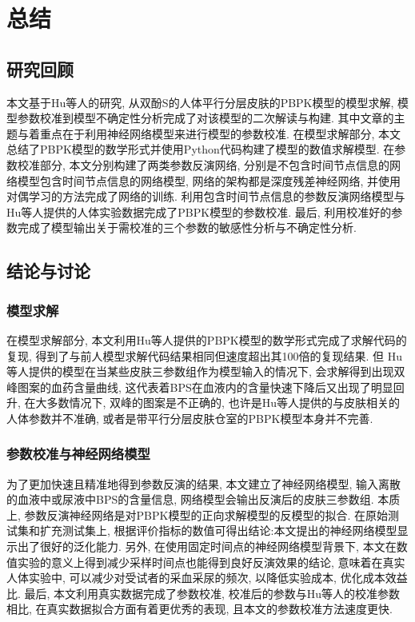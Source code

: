 \documentclass[a4paper,punct=banjiao,twoside]{ctexrep}
\theoremstyle{plain}
\theoremstyle{definition}
\theoremstyle{remark}
\begin{document}
\chapter{总结}

\section*{研究回顾}
本文基于Hu等人\cite{11}的研究, 从双酚S的人体平行分层皮肤的PBPK模型的模型求解, 模型参数校准到模型不确定性分析完成了对该模型的二次解读与构建.
其中文章的主题与着重点在于利用神经网络模型来进行模型的参数校准.
在模型求解部分, 本文总结了PBPK模型的数学形式并使用Python代码构建了模型的数值求解模型. 在参数校准部分, 本文分别构建了两类参数反演网络, 分别是不包含时间节点信息的网络模型包含时间节点信息的网络模型, 
网络的架构都是深度残差神经网络, 并使用对偶学习的方法完成了网络的训练. 利用包含时间节点信息的参数反演网络模型与Hu等人\cite{11}提供的人体实验数据完成了PBPK模型的参数校准. 最后, 利用校准好的参数完成了模型输出关于需校准的三个参数的敏感性分析与不确定性分析.

\section*{结论与讨论}
\subsection*{模型求解}
在模型求解部分, 本文利用Hu等人\cite{11}提供的PBPK模型的数学形式完成了求解代码的复现, 得到了与前人模型求解代码结果相同但速度超出其100倍的复现结果. 但
Hu等人提供的模型在当某些皮肤三参数组作为模型输入的情况下, 会求解得到出现双峰图案的血药含量曲线, 这代表着BPS在血液内的含量快速下降后又出现了明显回升, 在大多数情况下, 双峰的图案是不正确的,
也许是Hu等人提供的与皮肤相关的人体参数并不准确, 或者是带平行分层皮肤仓室的PBPK模型本身并不完善. 

\subsection*{参数校准与神经网络模型}

为了更加快速且精准地得到参数反演的结果, 本文建立了神经网络模型, 输入离散的血液中或尿液中BPS的含量信息, 网络模型会输出反演后的皮肤三参数组.
本质上, 参数反演神经网络是对PBPK模型的正向求解模型的反模型的拟合. 在原始测试集和扩充测试集上, 根据评价指标的数值可得出结论:本文提出的神经网络模型显示出了很好的泛化能力.
另外, 在使用固定时间点的神经网络模型背景下, 本文在数值实验的意义上得到减少采样时间点也能得到良好反演效果的结论, 意味着在真实人体实验中, 可以减少对受试者的采血采尿的频次, 以降低实验成本, 优化成本效益比.
最后, 本文利用真实数据完成了参数校准, 校准后的参数与Hu等人\cite{11}的校准参数相比, 在真实数据拟合方面有着更优秀的表现, 且本文的参数校准方法速度更快.
\end{document}
